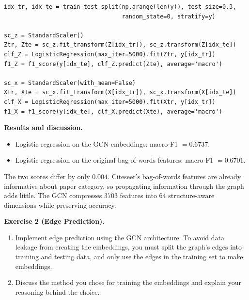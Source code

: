 \documentclass{article}
\begin{document}
\begin{tcolorbox}[colback=white, colframe=black!75, breakable, title=\textbf{Solution to Exercise 1}]
\begin{lstlisting}[style=python2]
idx_tr, idx_te = train_test_split(np.arange(len(y)), test_size=0.3,
                                  random_state=0, stratify=y)

sc_z = StandardScaler()
Ztr, Zte = sc_z.fit_transform(Z[idx_tr]), sc_z.transform(Z[idx_te])
clf_Z = LogisticRegression(max_iter=5000).fit(Ztr, y[idx_tr])
f1_Z = f1_score(y[idx_te], clf_Z.predict(Zte), average='macro')

sc_x = StandardScaler(with_mean=False)
Xtr, Xte = sc_x.fit_transform(X[idx_tr]), sc_x.transform(X[idx_te])
clf_X = LogisticRegression(max_iter=5000).fit(Xtr, y[idx_tr])
f1_X = f1_score(y[idx_te], clf_X.predict(Xte), average='macro')
\end{lstlisting}

\medskip
\textbf{Results and discussion.}
\begin{itemize}
    \item Logistic regression on the GCN embeddings: macro-F1 $= 0.6737$.
    \item Logistic regression on the original bag-of-words features: macro-F1 $= 0.6701$.
\end{itemize}

The two scores differ by only $0.004$. Citeseer's bag-of-words features are already informative about paper category, so propagating information through the graph adds little. The GCN compresses $3703$ features into $64$ structure-aware dimensions while preserving accuracy.
\end{tcolorbox}

\vspace{8pt}

\begin{tcolorbox}[colback = gray!16, enhanced, boxrule=0pt, frame hidden, sharp corners, borderline west={3pt}{-1.5pt}{black!80},breakable]
\textbf{Exercise 2 (Edge Prediction).}\begin{enumerate}[$(a)$]
    \item Implement edge prediction using the GCN architecture. To avoid data leakage from creating the embeddings, you must split the graph's edges into training and testing data, and only use the edges in the training set to make embeddings.
    \item Discuss the method you chose for training the embeddings and explain your reasoning behind the choice.
\end{enumerate}
\end{tcolorbox}
\end{document}
